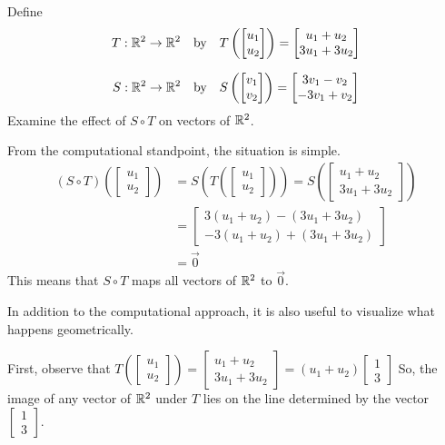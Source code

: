 \documentclass{ximera}
\begin{document}
\begin{example}\label{ex:transcomp} Define $$T:\mathbb{R}^2\rightarrow \mathbb{R}^2 \quad\text{by}\quad T\left(\begin{bmatrix}u_1\\u_2\end{bmatrix}\right)=\begin{bmatrix}u_1+u_2\\3u_1+3u_2\end{bmatrix}$$

$$S:\mathbb{R}^2\rightarrow \mathbb{R}^2 \quad\text{by}\quad S\left(\begin{bmatrix}v_1\\v_2\end{bmatrix}\right)=\begin{bmatrix}3v_1-v_2\\-3v_1+v_2\end{bmatrix}$$
Examine the effect of $S\circ T$ on vectors of $\mathbb{R}^2$.
\begin{explanation}
From the computational standpoint, the situation is simple.
\begin{align*}
(S\circ T)\left(\begin{bmatrix}u_1\\u_2\end{bmatrix}\right)&=S\left(T\left(\begin{bmatrix}u_1\\u_2\end{bmatrix}\right)\right)=S\left(\begin{bmatrix}u_1+u_2\\3u_1+3u_2\end{bmatrix}\right)\\
&=\begin{bmatrix}3(u_1+u_2)-(3u_1+3u_2)\\-3(u_1+u_2)+(3u_1+3u_2)\end{bmatrix}\\
&=\vec{0}
\end{align*}
This means that $S\circ T$ maps all vectors of $\mathbb{R}^2$ to $\vec{0}$.  

In addition to the computational approach, it is also useful to visualize what happens geometrically.

First, observe that $T\left(\begin{bmatrix}u_1\\u_2\end{bmatrix}\right)=\begin{bmatrix}u_1+u_2\\3u_1+3u_2\end{bmatrix}=(u_1+u_2)\begin{bmatrix}1\\3\end{bmatrix}$  So, the image of any vector of $\mathbb{R}^2$ under $T$ lies on the line determined by the vector $\begin{bmatrix}1\\3\end{bmatrix}$.  


\end{explanation}
\end{example}
\end{document}
